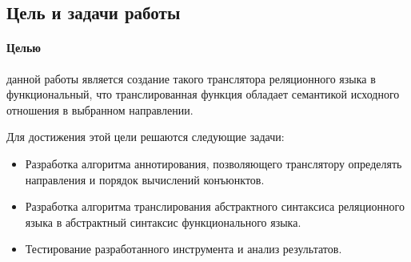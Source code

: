 \subsection{Цель и задачи работы}

\paragraph{Целью} данной работы является создание такого транслятора реляционного языка в функциональный, что транслированная функция обладает семантикой исходного отношения в выбранном направлении.

Для достижения этой цели решаются следующие задачи:

\begin{itemize}
    \item Разработка алгоритма аннотирования, позволяющего транслятору определять направления и порядок вычислений конъюнктов.
    
    \item Разработка алгоритма транслирования абстрактного синтаксиса реляционного языка в абстрактный синтаксис функционального языка.
    
    \item Тестирование разработанного инструмента и анализ результатов.

\end{itemize}
